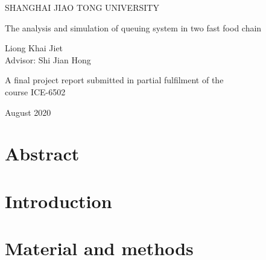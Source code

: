\documentclass[a4paper,11]{article}
\begin{document}
\begin{center}
	{\large SHANGHAI JIAO TONG UNIVERSITY}
\end{center}
\vspace{6cm}

\begin{center}

	\Huge The analysis and simulation of queuing system in two fast food chain\\
	\vspace{.5cm}
	

\end{center}
\vspace{2.5cm}
\begin{center}
	\Large Liong Khai Jiet\\Advisor: Shi Jian Hong
\end{center}

\vspace{8cm}
\begin{center}
	{\large A final project report submitted in partial fulfilment of the \\course ICE-6502 }
\end{center}

\begin{center}
	{\large August 2020}
\end{center}

\newpage
{}


\tableofcontents
\pagebreak
\newpage

\cleardoublepage{}


\section*{Abstract}

\pagebreak

\section{Introduction}

\pagebreak

\section{Material and methods}

\pagebreak
\end{document}
